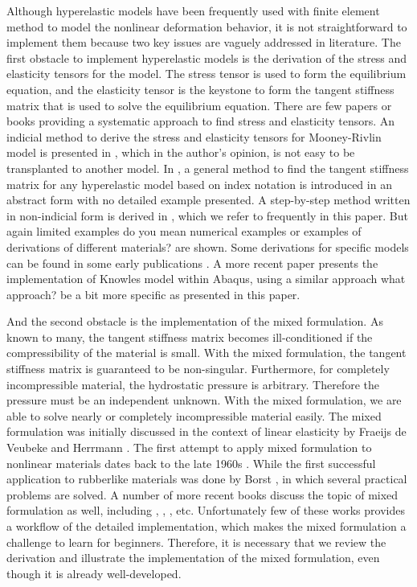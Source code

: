 Although hyperelastic models have been frequently used with finite element method to model the nonlinear deformation behavior, it is not straightforward to implement them because two key issues are vaguely addressed in literature. The first obstacle to implement hyperelastic models is the derivation of the stress and elasticity tensors for the model. The stress tensor is used to form the equilibrium equation, and the elasticity tensor is the keystone to form the tangent stiffness matrix that is used to solve the equilibrium equation. There are few papers or books providing a systematic approach to find stress and elasticity tensors. An indicial method to derive the stress and elasticity tensors for Mooney-Rivlin model is presented in \cite{Bower}, which in the author's opinion, is not easy to be transplanted to another model. In \cite{Belytschko}, a general method to find the tangent stiffness matrix for any hyperelastic model based on index notation is introduced in an abstract form with no detailed example presented. A step-by-step method written in non-indicial form is derived in \cite{Holzapfel}, which we refer to frequently in this paper. But again limited examples {\color{red} do you mean numerical examples or examples of derivations of different materials?} are shown. Some derivations for specific models can be found in some early publications \cite{Weiss, Nicholson}. A more recent paper \cite{Suchocki} presents the implementation of Knowles model within Abaqus, using a similar approach {\color{red} what approach? be a bit more specific} as presented in this paper. %


And the second obstacle is the implementation of the mixed formulation. As known to many, the tangent stiffness matrix becomes ill-conditioned if the compressibility of the material is small. With the mixed formulation, the tangent stiffness matrix is guaranteed to be non-singular. Furthermore, for completely incompressible material, the hydrostatic pressure is arbitrary. Therefore the pressure must be an independent unknown. With the mixed formulation, we are able to solve nearly or completely incompressible material easily. 
The mixed formulation was initially discussed in the context of linear elasticity by Fraeijs de Veubeke \cite{Veubeke} and Herrmann \cite{Herrmann}. The first attempt to apply mixed formulation to nonlinear materials dates back to the late 1960s \cite{Oden}. While the first successful application to rubberlike materials was done by Borst \cite{Borst}, in which several practical problems are solved. A number of more recent books discuss the topic of mixed formulation as well, including \cite{Bathe}, \cite{Holzapfel}, \cite{Zienkiewicz}, etc. Unfortunately few of these works provides a workflow of the detailed implementation, which makes the mixed formulation a challenge to learn for beginners. Therefore, it is necessary that we review the derivation and illustrate the implementation of the mixed formulation, even though it is already well-developed.

